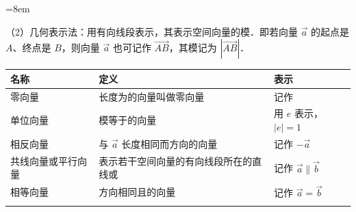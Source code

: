 \vspace{1.7mm}%
\begin{multicols}{2}
\emergencystretch=8em





\bindp （2）几何表示法：用有向线段表示，其表示空间向量的模．即若向量 \(\overrightarrow{a}\) 的起点是 \(A\)、终点是 \(B\)，则向量 \(\overrightarrow{a}\) 也可记作 \(\overrightarrow{AB}\)，其模记为 \(\left| \overrightarrow{AB} \right|\)．


{\setlength{\tabcolsep}{2pt}
\vspace{-3.8mm}
\noindent\begin{tabular}{!{\vline width 0.8pt}>{\centering\arraybackslash}p{16mm}!{\vline width 0.4pt}>{\raggedright\arraybackslash}p{35mm}!{\vline width 0.4pt}>{\raggedright\arraybackslash}p{29mm}!{\vline width 0.8pt}}
\thickhline
{\textbf{名称}} & {\textbf{定义}} & {\textbf{表示}} \\
\hline
零向量 & 长度为的向量叫做零向量 & 记作 \\ \hline
单位向量 & 模等于的向量 & 用 \(e\) 表示，\(|e|=1\) \\ \hline
相反向量 & 与 \(\overrightarrow{a}\) 长度相同而方向的向量 & 记作 \(-\overrightarrow{a}\) \\ \hline
共线向量或平行向量 & 表示若干空间向量的有向线段所在的直线或 & 记作 \(\overrightarrow{a}\parallel\overrightarrow{b}\) \\ \hline
相等向量 & 方向相同且的向量 & 记作 \(\overrightarrow{a}=\overrightarrow{b}\) \\
\thickhline
\end{tabular}\par
}


\end{multicols}
